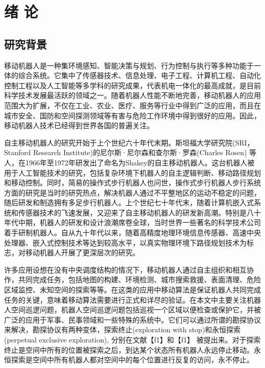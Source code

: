 \chapter{绪\hskip 0.4cm 论}

\section{研究背景}
移动机器人是一种集环境感知、智能决策与规划、行为控制与执行等多种功能于一体的综合系统。它集中了传感器技术、信息处理、电子工程、计算机工程、自动化控制工程以及人工智能等多学科的研究成果，代表机电一体化的最高成就，是目前科学技术发展最活跃的领域之一。随着机器人性能不断地完善，移动机器人的应用范围大为扩展，不仅在工业、农业、医疗、服务等行业中得到广泛的应用，而且在城市安全、国防和空间探测领域等有害与危险工作环境中得到很好的应用。因此，移动机器人技术已经得到世界各国的普遍关注。

自主移动机器人的研究开始于上个世纪六十年代末期。斯坦福大学研究院(SRI，Stanford Research Institute)的尼尔斯·尼尔森和查尔斯·罗森(Charles Rosen) 等人，在1966年至1972年研发出了命名为Shakey的自主移动机器人。这台机器人被用于人工智能技术的研究，包括复杂环境下机器人的自主逻辑判断、移动路径规划和移动控制。同时，简易的操作式步行机器人也问世，操作式步行机器人步行系统方面的研究是当时的研究热点，解决机器人通过不平整地区的运动不稳定的问题，随后研发和制造拥有多足步行机器人。上个世纪七十年代末，随着计算机嵌入式系统和传感器技术的飞速发展，又迎来了自主移动机器人的研发新高潮。特别是八十年代中期，机器人的研发和设计浪潮席卷全球，当时世界一些著名的科学技术公司着手研制机器人。自从九十年代以来，随着高精度地理环境信息传感器、高速中央处理器、嵌入式控制技术等达到较高水平，以真实物理环境下路径规划技术为标志，对移动机器人开展了更深层次的研究。

许多应用设想在没有中央调度结构的情况下，移动机器人通过自主组织和相互协作，共同完成任务，包括地图的构建、环境检测、城市搜索救援、表面清理、危险区域监控、未知空间的探索等等。在这类的应用中移动算法是保证机器人共同完成任务的关键，意味着移动算法需要进行正式和详尽的验证。在本文中主要关注机器人空间巡逻问题，机器人空间巡逻问题包括巡视一个区域以便检查或保护它，并被广泛的应用于军事、民事领域和一些特殊的系统中。它们可以通过所谓的勘探协议来解决，勘探协议有两种变体，探索终止(exploration with stop)和永恒探索(perpetual exclusive exploration), 分别在文献【f1】和【f1】 被提出来。对于探索终止是空间中所有的位置被探索之后，到达某个状态所有机器人永远停止移动。永恒探索是空间中所有机器人都对空间中的每个位置进行反复的访问，永不停止。

